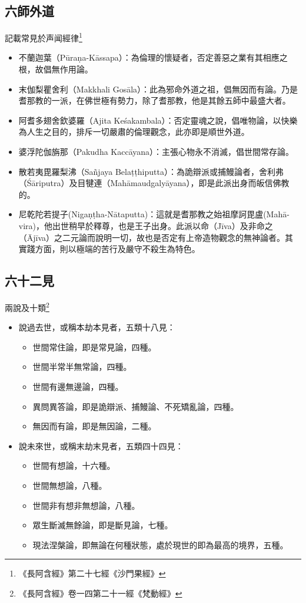 \subsection{六師外道}
記載常見於声闻經律\footnote{《長阿含經》第二十七經《沙門果經》}
\begin{itemize}
  \item 不蘭迦葉（Pūraṇa-Kāssapa）：為倫理的懷疑者，否定善惡之業有其相應之根，故倡無作用論。
  \item 末伽梨瞿舍利（Makkhali Gosāla）：此為邪命外道之祖，倡無因而有論。乃是耆那教的一派，在佛世極有勢力，除了耆那教，他是其餘五師中最盛大者。
  \item 阿耆多翅舍欽婆羅（Ajita Keśakambala）：否定靈魂之說，倡唯物論，以快樂為人生之目的，排斥一切嚴肅的倫理觀念，此亦即是順世外道。
  \item 婆浮陀伽旃那（Pakudha Kaccāyana）：主張心物永不消滅，倡世間常存論。
  \item 散若夷毘羅梨沸（Sañjaya Belaṭṭhiputta）：為詭辯派或捕鰻論者，舍利弗（Śāriputra）及目犍連（Mahāmaudgalyāyana），即是此派出身而皈信佛教的。
  \item 尼乾陀若提子(Nigaṇṭha-Nātaputta)：這就是耆那教之始祖摩訶毘盧(Mahā-vira)，他出世稍早於釋尊，也是王子出身。此派以命（Jīva）及非命之（Ājīva）之二元論而說明一切，故也是否定有上帝造物觀念的無神論者。其實踐方面，則以極端的苦行及嚴守不殺生為特色。
\end{itemize}

\subsection{六十二見}
兩說及十類\footnote{《長阿含經》卷一四第二十一經《梵動經》}
\begin{itemize}
  \item 說過去世，或稱本劫本見者，五類十八見：
    \begin{itemize}
      \item 世間常住論，即是常見論，四種。
      \item 世間半常半無常論，四種。
      \item 世間有邊無邊論，四種。
      \item 異問異答論，即是詭辯派、捕鰻論、不死矯亂論，四種。
      \item 無因而有論，即是無因論，二種。
    \end{itemize}
  \item 說未來世，或稱末劫末見者，五類四十四見：
    \begin{itemize}
      \item 世間有想論，十六種。
      \item 世間無想論，八種。
      \item 世間非有想非無想論，八種。
      \item 眾生斷滅無餘論，即是斷見論，七種。
      \item 現法涅槃論，即無論在何種狀態，處於現世的即為最高的境界，五種。
    \end{itemize}
\end{itemize}

